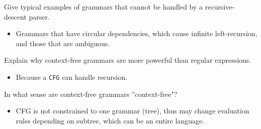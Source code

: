 \documentclass[11pt]{beamer}
\begin{document}
\begin{frame}

\begin{block}{Give typical examples of grammars that cannot be handled by a recursive- descent parser.}
\begin{itemize}
\item Grammars that have circular dependencies, which cause infinite left-recursion, and those that are ambiguous.
\end{itemize}
\end{block}


\begin{block}{Explain why context-free grammars are more powerful than regular expressions.}
\begin{itemize}
\item Because a \texttt{CFG} can handle recursion.
\end{itemize}
\end{block}


\begin{block}{In what sense are context-free grammars ”context-free"?}
\begin{itemize}
\item CFG is not constrained to one grammar (tree), thus may change evaluation rules depending on subtree, which can be an entire language.
\end{itemize}
\end{block}

\end{frame}
\end{document}
